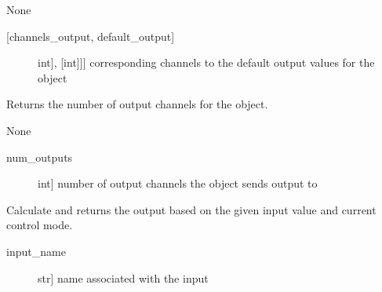 \documentclass[letterpaper,10pt,english]{sphinxmanual}
\begin{document}
\begin{fulllineitems}
\begin{fulllineitems}
\sphinxAtStartPar
{}

\sphinxAtStartPar
None

\sphinxAtStartPar
{}
\begin{description}
\item[{{[}channels\_output, default\_output{]}}] \leavevmode{[}{[}{[}int{]}, {[}int{]}{]}{]}
\sphinxAtStartPar
corresponding channels to the default output values for the object

\end{description}

\end{fulllineitems}


\begin{fulllineitems}
\label{\detokenize{specific:EyebrowsOutput.EyebrowsOutput.get_num_channels}}
\sphinxAtStartPar
Returns the number of output channels for the object.

\sphinxAtStartPar
{}

\sphinxAtStartPar
None

\sphinxAtStartPar
{}
\begin{description}
\item[{num\_outputs}] \leavevmode{[}int{]}
\sphinxAtStartPar
number of output channels the object sends output to

\end{description}

\end{fulllineitems}


\begin{fulllineitems}
\label{\detokenize{specific:EyebrowsOutput.EyebrowsOutput.get_output}}
\sphinxAtStartPar
Calculate and returns the output based on the given input value and current control mode.

\sphinxAtStartPar
{}
\begin{description}
\item[{input\_name}] \leavevmode{[}str{]}
\sphinxAtStartPar
name associated with the input


\end{description}
\end{fulllineitems}
\end{fulllineitems}
\end{document}
